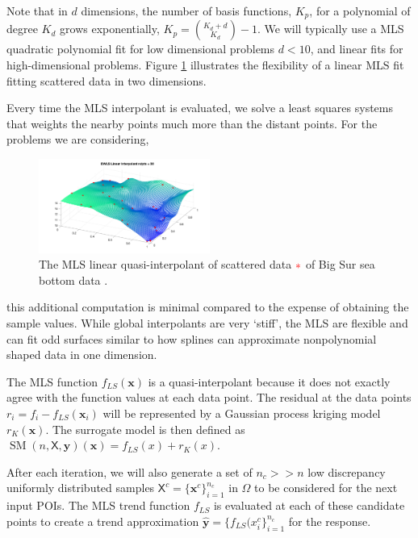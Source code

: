 \documentclass[11pt]{NSFamsart}
\DeclareMathOperator{\SURR}{SM} %
\newcommand{\mX}{\mathsf{X}}
\newcommand{\bx}{{\boldsymbol{x}}}
\newcommand{\by}{{\boldsymbol{y}}}
\begin{document}
Note that in $d$ dimensions, the number of basis functions, $K_p$,  for a polynomial of degree $K_d$ grows exponentially, $K_p={K_d + d \choose K_d} -1$.  
We will typically use a MLS quadratic polynomial fit for low dimensional problems $d<10$, and linear fits for high-dimensional problems.    
Figure \ref{MLS} illustrates the flexibility of a linear MLS fit fitting scattered data in two dimensions.  

Every time the MLS interpolant is evaluated, we  solve a least squares systems that  weights the nearby points much more than the distant points.
For the problems we are considering,
\begin{figure}
	  \begin{center}
	\includegraphics[width = 0.5\textwidth]{ProgramsImages/bigsurT.pdf}
	 \end{center}
	\caption{The  MLS linear quasi-interpolant of scattered data {$\color{red}*$} of  Big Sur sea bottom data \cite{franke1979critical}.
	\label{MLS}}
\end{figure}
 this additional computation is minimal compared to the expense of obtaining the sample values.  While global interpolants are very `stiff', the MLS are flexible and can fit odd surfaces similar to how splines can approximate nonpolynomial shaped data in one dimension.  
 
The MLS function $f_{LS}(\bx)$ is a quasi-interpolant because it does not exactly agree with the function values at each data point.  The residual at the data points $r_i = f_i - f_{LS}(\bx_i)$ will be represented by a Gaussian process kriging model $r_{K}(\bx)$.
The surrogate model is then defined as $\SURR(n,\mX,\by)(\bx)=f_{LS}(x) + r_{K}(x)$.  

After each iteration, we will also generate a set of $n_c>>n$ low discrepancy uniformly distributed samples $\mX^c = \{ \bx^c \}_{i=1}^{n_c}$ in $\Omega$ to be 
considered for the next input POIs.  The MLS trend function $f_{LS}$ is evaluated at each of these candidate points to create a trend approximation $\hat \by = \{ f_{LS}(x^c_i \}_{i=1}^{n_c}$ for the response. 
\end{document}

